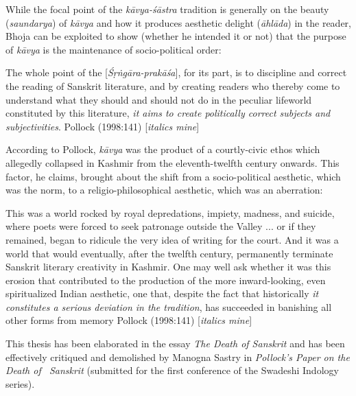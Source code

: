 While the focal point of the \textsl{kāvya-śāstra} tradition is generally on the beauty (\textsl{saundarya}) of \textsl{kāvya} and how it produces aesthetic delight (\textsl{āhlāda}) in the reader, Bhoja can be exploited to show (whether he intended it or not) that the purpose of \textsl{kāvya} is the maintenance of socio-political order:

\vskip 4pt

\begin{myquote}
The whole point of the [\textsl{Śṛṅgāra-prakāśa}], for its part, is to discipline and correct the reading of Sanskrit literature, and by creating readers who thereby come to understand what they should and should not do in the peculiar lifeworld constituted by this literature, \textsl{it aims to create politically correct subjects and subjectivities}. 
\hfill Pollock (1998:141) [\textsl{italics mine}]
\end{myquote}

\vskip 4pt

According to Pollock, \textsl{kāvya} was the product of a courtly-civic ethos which allegedly collapsed in Kashmir from the eleventh-twelfth century onwards. This factor, he claims, brought about the shift from a socio-political aesthetic, which was the norm, to a religio-philosophical aesthetic, which was an aberration:

\vskip 4pt

\begin{myquote}
This was a world rocked by royal depredations, impiety, madness, and suicide, where poets were forced to seek patronage outside the Valley ... or if they remained, began to ridicule the very idea of writing for the court. And it was a world that would eventually, after the twelfth century, permanently terminate Sanskrit literary creativity in Kashmir. One may well ask whether it was this erosion that contributed to the production of the more inward-looking, even spiritualized Indian aesthetic, one that, despite the fact that historically \textsl{it constitutes a serious deviation in the tradition}, has succeeded in banishing all other forms from memory
\hfill Pollock (1998:141) [\textsl{italics mine}]
\end{myquote}

\smallskip

This thesis has been elaborated in the essay \textsl{The Death of Sanskrit} and has been effectively critiqued and demolished by Manogna Sastry in \textsl{Pollock's Paper on the Death of \ Sanskrit} (submitted for the first conference of the Swadeshi Indology series).

